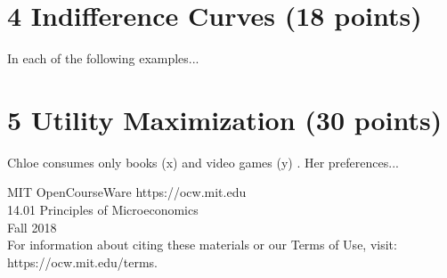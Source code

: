 \documentclass[12pt]{article}
\begin{document}
\section*{4 Indifference Curves (18 points)}
In each of the following examples...

\section*{5 Utility Maximization (30 points)}
Chloe consumes only books (x) and video games (y) . Her preferences...

\noindent
MIT OpenCourseWare https://ocw.mit.edu\\
14.01 Principles of Microeconomics\\
Fall 2018\\
For information about citing these materials or our Terms of Use, visit: https://ocw.mit.edu/terms.
\end{document}

